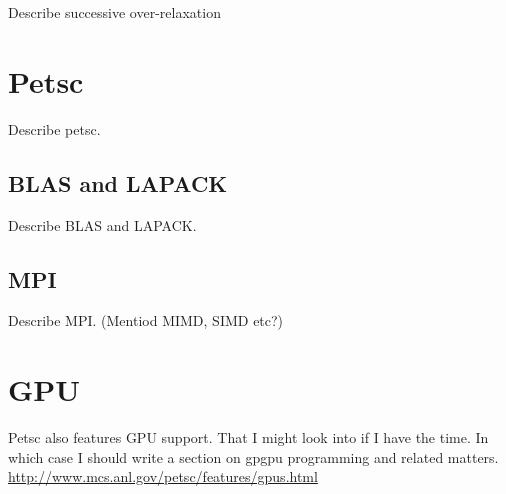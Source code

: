 Describe successive over-relaxation

\section*{Petsc}

Describe petsc.

\subsection*{BLAS and LAPACK}

Describe BLAS and LAPACK.

\subsection*{MPI}

Describe MPI. (Mentiod MIMD, SIMD etc?)

\section*{GPU}

Petsc also features GPU support. That I might look into if I have the time. In which case I should write a section on gpgpu programming and related matters.\\
\url{http://www.mcs.anl.gov/petsc/features/gpus.html}


